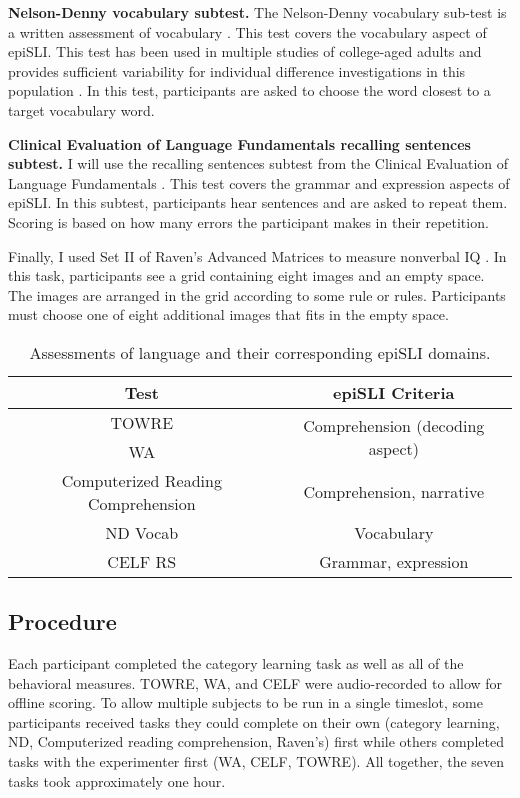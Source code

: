 \documentclass[../dissertation.tex]{subfiles}
\begin{document}
	\textbf{Nelson-Denny vocabulary subtest.} The Nelson-Denny vocabulary sub-test is a written assessment of vocabulary \citep{Brown1981}. This test covers the vocabulary aspect of epiSLI. This test has been used in multiple studies of college-aged adults and provides sufficient variability for individual difference investigations in this population \citetext{e.g., \citealt{Boudewyn2015}; \citealt{Stafura2014}}. In this test, participants are asked to choose the word closest to a target vocabulary word. \par
	\textbf{Clinical Evaluation of Language Fundamentals recalling sentences subtest.} I will use the recalling sentences subtest from the Clinical Evaluation of Language Fundamentals \citetext{CELF; \citealt{Semel2006}; \citealt{Stafura2014}}. This test covers the grammar and expression aspects of epiSLI. In this subtest, participants hear sentences and are asked to repeat them. Scoring is based on how many errors the participant makes in their repetition.  \par
	Finally, I used Set II of Raven's Advanced Matrices to measure nonverbal IQ \citep{Raven1998}. In this task, participants see a grid containing eight images and an empty space. The images are arranged in the grid according to some rule or rules. Participants must choose one of eight additional images that fits in the empty space.

\begin{table}[H]
\caption{Assessments of language and their corresponding epiSLI domains.}
\vspace{-10pt}
\begin{center}
\begin{tabular}{ c|c } 
 \hline 
 Test & epiSLI Criteria \\ 
 \hline
 TOWRE & \multirow{2}{*}{Comprehension (decoding aspect)}\\ 
 WA & \\ 
 Computerized Reading Comprehension & Comprehension, narrative \\
 ND Vocab & Vocabulary \\ 
 CELF RS & Grammar, expression \\ 
 \hline
\end{tabular}
\end{center}
\label{slitable}
\end{table}


\subsection{Procedure}
	Each participant completed the category learning task as well as all of the behavioral measures. TOWRE, WA, and CELF were audio-recorded to allow for offline scoring. To allow multiple subjects to be run in a single timeslot, some participants received tasks they could complete on their own (category learning, ND, Computerized reading comprehension, Raven's) first while others completed tasks with the experimenter first (WA, CELF, TOWRE). All together, the seven tasks took approximately one hour.
	
\end{document}
